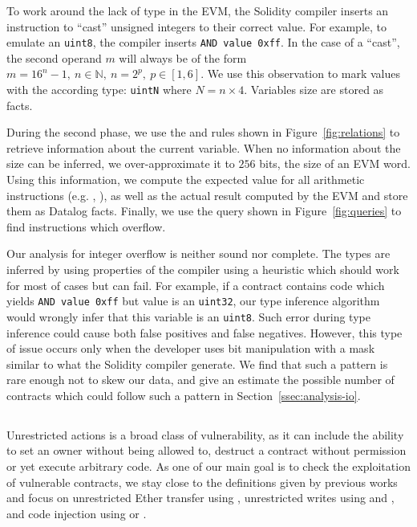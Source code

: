 To work around the lack of type in the EVM, the Solidity compiler inserts an  instruction to ``cast'' unsigned integers to their correct value. For example, to emulate an \lstinline{uint8}, the compiler inserts \lstinline{AND value 0xff}. In the case of a ``cast'', the second operand $m$ will always be of the form $m = 16^n - 1,~n\in \mathbb{N},~n = 2^p,~p \in [1, 6]$. We use this observation to mark values with the according type: \lstinline{uintN} where $N = n \times 4$. Variables size are stored as  facts.

During the second phase, we use the  and  rules shown in Figure~\ref{fig:relations} to retrieve information about the current variable. When no information about the size can be inferred, we over-approximate it to $256$ bits, the size of an EVM word. Using this information, we compute the expected value for all arithmetic instructions (e.g. , ), as well as the actual result computed by the EVM and store them as Datalog facts. Finally, we use the query shown in Figure~\ref{fig:queries} to find instructions which overflow.

\correctness Our analysis for integer overflow is neither sound nor complete. The types are inferred by using properties of the compiler using a heuristic which should work for most of cases but can fail. For example, if a contract contains code which yields \lstinline{AND value 0xff} but value is an \lstinline{uint32}, our type inference algorithm would wrongly infer that this variable is an \lstinline{uint8}. Such error during type inference could cause both false positives and false negatives. However, this type of issue occurs only when the developer uses bit manipulation with a mask similar to what the Solidity compiler generate. We find that such a pattern is rare enough not to skew our data, and give an estimate the possible number of contracts which could follow such a pattern in Section~\ref{ssec:analysis-io}.

\subsection{\unrestrictedaction}
\label{ssec:method-ua}
Unrestricted actions is a broad class of vulnerability, as it can include the ability to set an owner without being allowed to, destruct a contract without permission or yet execute arbitrary code.
As one of our main goal is to check the exploitation of vulnerable contracts, we stay close to the definitions given by previous works~\cite{Krupp2018} and focus on unrestricted Ether transfer using , unrestricted writes using and , and code injection using  or .

